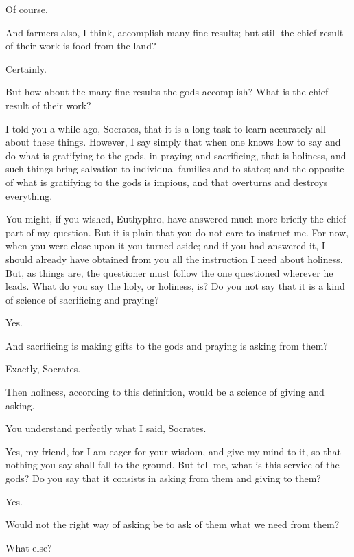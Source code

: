 \documentclass[letterpaper,12pt]{article}
\newcommand{\stephpag}[1]{\marginnote{\small\itshape\fontfamily{ppl}\selectfont #1}}
\begin{document}
\begin{drama}
\euthyphrospeaks
Of course.

\socratesspeaks
And farmers also, I think, accomplish many fine results; but still the chief result of their work is food from the land?

\euthyphrospeaks
Certainly.

\socratesspeaks
But how about the many fine results the gods accomplish? What is the chief result of their work?

\euthyphrospeaks
I told you a while ago, Socrates, \stephpag{b} that it is a long task to learn accurately all about these things. However, I say simply that when one knows how to say and do what is gratifying to the gods, in praying and sacrificing, that is holiness, and such things bring salvation to individual families and to states; and the opposite of what is gratifying to the gods is impious, and that overturns and destroys everything.

\socratesspeaks
You might, if you wished, Euthyphro, have answered much more briefly the chief part of my question. But it is plain that you do not care to instruct me. \stephpag{c} For now, when you were close upon it you turned aside; and if you had answered it, I should already have obtained from you all the instruction I need about holiness. But, as things are, the questioner must follow the one questioned wherever he leads. What do you say the holy, or holiness, is? Do you not say that it is a kind of science of sacrificing and praying?

\euthyphrospeaks
Yes.

\socratesspeaks
And sacrificing is making gifts to the gods \stephpag{d} and praying is asking from them?

\euthyphrospeaks
Exactly, Socrates.

\socratesspeaks
Then holiness, according to this definition, would be a science of giving and asking.

\euthyphrospeaks
You understand perfectly what I said, Socrates.

\socratesspeaks
Yes, my friend, for I am eager for your wisdom, and give my mind to it, so that nothing you say shall fall to the ground. But tell me, what is this service of the gods? Do you say that it consists in asking from them and giving to them?

\euthyphrospeaks
Yes.

\socratesspeaks
Would not the right way of asking be to ask of them what we need from them?

\euthyphrospeaks
What else?


\end{drama}
\end{document}
